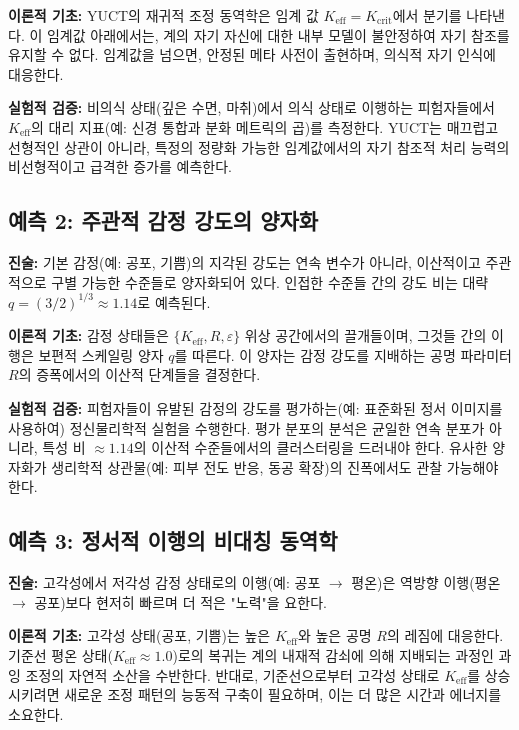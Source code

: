 \documentclass[12pt,a4paper]{article}
\begin{document}
	\textbf{이론적 기초:} YUCT의 재귀적 조정 동역학은 임계 값 \(K_{\mathrm{eff}} = K_{\mathrm{crit}}\)에서 분기를 나타낸다. 이 임계값 아래에서는, 계의 자기 자신에 대한 내부 모델이 불안정하여 자기 참조를 유지할 수 없다. 임계값을 넘으면, 안정된 메타 사전이 출현하며, 의식적 자기 인식에 대응한다.
	
	\textbf{실험적 검증:} 비의식 상태(깊은 수면, 마취)에서 의식 상태로 이행하는 피험자들에서 \(K_{\mathrm{eff}}\)의 대리 지표(예: 신경 통합과 분화 메트릭의 곱)를 측정한다. YUCT는 매끄럽고 선형적인 상관이 아니라, 특정의 정량화 가능한 임계값에서의 자기 참조적 처리 능력의 비선형적이고 급격한 증가를 예측한다.
	
	\subsection{예측 2: 주관적 감정 강도의 양자화}
	
	\textbf{진술:} 기본 감정(예: 공포, 기쁨)의 지각된 강도는 연속 변수가 아니라, 이산적이고 주관적으로 구별 가능한 수준들로 양자화되어 있다. 인접한 수준들 간의 강도 비는 대략 \(q = (3/2)^{1/3} \approx 1.14\)로 예측된다.
	
	\textbf{이론적 기초:} 감정 상태들은 \(\{K_{\mathrm{eff}}, R, \varepsilon\}\) 위상 공간에서의 끌개들이며, 그것들 간의 이행은 보편적 스케일링 양자 \(q\)를 따른다. 이 양자는 감정 강도를 지배하는 공명 파라미터 \(R\)의 증폭에서의 이산적 단계들을 결정한다.
	
	\textbf{실험적 검증:} 피험자들이 유발된 감정의 강도를 평가하는(예: 표준화된 정서 이미지를 사용하여) 정신물리학적 실험을 수행한다. 평가 분포의 분석은 균일한 연속 분포가 아니라, 특성 비 \(\approx 1.14\)의 이산적 수준들에서의 클러스터링을 드러내야 한다. 유사한 양자화가 생리학적 상관물(예: 피부 전도 반응, 동공 확장)의 진폭에서도 관찰 가능해야 한다.
	
	\subsection{예측 3: 정서적 이행의 비대칭 동역학}
	
	\textbf{진술:} 고각성에서 저각성 감정 상태로의 이행(예: 공포 \(\rightarrow\) 평온)은 역방향 이행(평온 \(\rightarrow\) 공포)보다 현저히 빠르며 더 적은 "노력"을 요한다.
	
	\textbf{이론적 기초:} 고각성 상태(공포, 기쁨)는 높은 \(K_{\mathrm{eff}}\)와 높은 공명 \(R\)의 레짐에 대응한다. 기준선 평온 상태(\(K_{\mathrm{eff}} \approx 1.0\))로의 복귀는 계의 내재적 감쇠에 의해 지배되는 과정인 과잉 조정의 자연적 소산을 수반한다. 반대로, 기준선으로부터 고각성 상태로 \(K_{\mathrm{eff}}\)를 상승시키려면 새로운 조정 패턴의 능동적 구축이 필요하며, 이는 더 많은 시간과 에너지를 소요한다.
	
\end{document}
